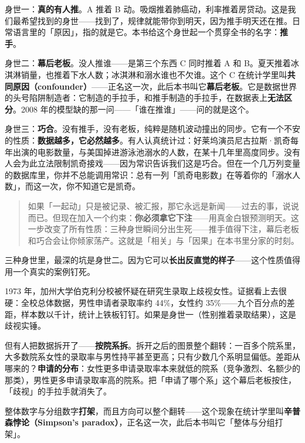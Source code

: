 \documentclass[../../main2.tex]{subfiles}
\begin{document}
	身世一：\textbf{真的有人推}。A 推着 B 动。吸烟推着肺癌动，利率推着房贷动。这是我们最希望找到的身世——找到了，规律就能带你到明天，因为推手明天还在推。日常语言里的「原因」，指的就是它。本书给这个身世起一个贯穿全书的名字：\textbf{推手}。

	身世二：\textbf{幕后老板}。没人推谁——是第三个东西 C 同时推着 A 和 B。夏天推着冰淇淋销量，也推着下水人数；冰淇淋和溺水谁也不欠谁。这个 C 在统计学里叫\textbf{共同原因（confounder）}——正名这一次，此后本书叫它\textbf{幕后老板}。它是数据世界的头号陷阱制造者：它制造的手拉手，和推手制造的手拉手，在数据表上\textbf{无法区分}。2008 年的模型缺的那一问——「谁在推谁」——问的就是这个。

	身世三：\textbf{巧合}。没有推手，没有老板，纯粹是随机波动撞出的同步。它有一个不安的性质：\textbf{数据越多，它必然越多}。有人认真统计过：好莱坞演员尼古拉斯·凯奇每年出演的电影数量，与美国掉进游泳池溺水的人数，在某十几年里高度同步。没有人会为此立法限制凯奇接戏——因为常识告诉我们这是巧合。但在一个几万列变量的数据库里，你并不总能调用常识：总有一列「凯奇电影数」在等着你的「溺水人数」，而这一次，你不知道它是凯奇。

	\begin{quote}
		如果「一起动」只是被记录、被汇报，那它永远是新闻——过去的事，说说而已。但现在加入一个约束：\textbf{你必须拿它下注}——用真金白银预测明天。这一步改变了所有性质：三种身世瞬间分出生死——推手值得下注，幕后老板和巧合会让你倾家荡产。这就是「相关」与「因果」在本书里分家的时刻。
	\end{quote}

	三种身世里，最深的坑是身世二。因为它可以\textbf{长出反直觉的样子}——这个性质值得用一个真实的案例钉死。

	1973 年，加州大学伯克利分校被怀疑在研究生录取上歧视女性。证据看上去很硬：全校总体数据，男性申请者录取率约 44\%，女性约 35\%——九个百分点的差距，样本数以千计，统计上铁板钉钉。如果是身世一（性别推着录取结果），这是歧视实锤。

	但有人把数据拆开了——\textbf{按院系拆}。拆开之后的图景整个翻转：一百多个院系里，大多数院系女性的录取率与男性持平甚至更高；只有少数几个系明显偏低。差距从哪来的？\textbf{申请的分布}：女性更多申请录取率本来就低的院系（竞争激烈、名额少的那类），男性更多申请录取率高的院系。把「申请了哪个系」这个幕后老板按住，「歧视」的手拉手就消失了。

	整体数字与分组数字\textbf{打架}，而且方向可以整个翻转——这个现象在统计学里叫\textbf{辛普森悖论（Simpson's paradox）}，正名这一次，此后本书叫它「整体与分组打架」。
\end{document}
